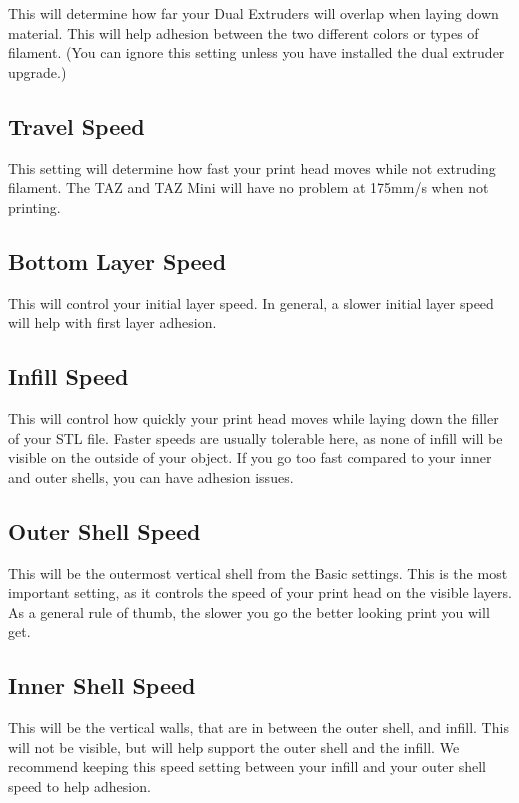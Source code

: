 This will determine how far your Dual Extruders will overlap when laying down material. This will help adhesion between the two different colors or types of filament. (You can ignore this setting unless you have installed the dual extruder upgrade.)

\subsection{Travel Speed}

This setting will determine how fast your print head moves while not extruding filament. The TAZ and TAZ Mini will have no problem at 175mm/s when not printing.

\subsection{Bottom Layer Speed}

This will control your initial layer speed. In general, a slower initial layer speed will help with first layer adhesion. 

\subsection{Infill Speed}

This will control how quickly your print head moves while laying down the filler of your STL file. Faster speeds are usually tolerable here, as none of infill will be visible on the outside of your object. If you go too fast compared to your inner and outer shells, you can have adhesion issues.

\subsection{Outer Shell Speed}

This will be the outermost vertical shell from the Basic settings. This is the most important setting, as it controls the speed of your print head on the visible layers. As a general rule of thumb, the slower you go the better looking print you will get. 

\subsection{Inner Shell Speed}

This will be the vertical walls, that are in between the outer shell, 	and infill. This will not be visible, but will help support the outer shell and the infill. We recommend keeping this speed setting between your infill and your outer shell speed to help adhesion.

